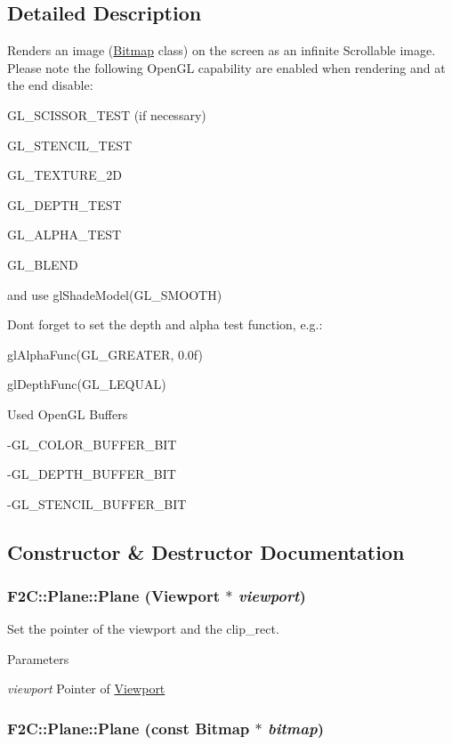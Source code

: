 \subsection{Detailed Description}
Renders an image (\hyperlink{class_f2_c_1_1_bitmap}{Bitmap} class) on the screen as an infinite Scrollable image. Please note the following OpenGL capability are enabled when rendering and at the end disable: \par
 GL\_\-SCISSOR\_\-TEST (if necessary) \par
 GL\_\-STENCIL\_\-TEST \par
 GL\_\-TEXTURE\_\-2D \par
 GL\_\-DEPTH\_\-TEST \par
 GL\_\-ALPHA\_\-TEST \par
 GL\_\-BLEND \par
 and use glShadeModel(GL\_\-SMOOTH) \par
 \par
 Dont forget to set the depth and alpha test function, e.g.: \par
 glAlphaFunc(GL\_\-GREATER, 0.0f) \par
 glDepthFunc(GL\_\-LEQUAL) \par
 \par
 Used OpenGL Buffers \par
 -\/GL\_\-COLOR\_\-BUFFER\_\-BIT \par
 -\/GL\_\-DEPTH\_\-BUFFER\_\-BIT \par
 -\/GL\_\-STENCIL\_\-BUFFER\_\-BIT \par
 

\subsection{Constructor \& Destructor Documentation}
\hypertarget{class_f2_c_1_1_plane_a257596b463548284ec5699e5290b4a9d}{
\subsubsection[{Plane}]{\setlength{\rightskip}{0pt plus 5cm}F2C::Plane::Plane ({\bf Viewport} $\ast$ {\em viewport})}}
\label{class_f2_c_1_1_plane_a257596b463548284ec5699e5290b4a9d}


Set the pointer of the viewport and the clip\_\-rect. 
\begin{DoxyParams}{Parameters}
\item[{\em viewport}]Pointer of \hyperlink{class_f2_c_1_1_viewport}{Viewport} \end{DoxyParams}
\hypertarget{class_f2_c_1_1_plane_a2d6c6add986f779ce1879a4ac4ad5458}{
\subsubsection[{Plane}]{\setlength{\rightskip}{0pt plus 5cm}F2C::Plane::Plane (const {\bf Bitmap} $\ast$ {\em bitmap})}}
\label{class_f2_c_1_1_plane_a2d6c6add986f779ce1879a4ac4ad5458}


